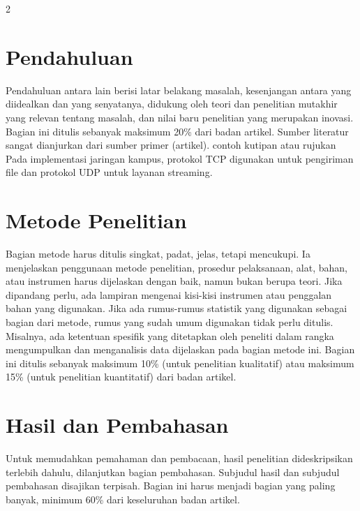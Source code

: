 \documentclass{jurnalft}
\begin{document}
	\begin{multicols}{2}
	\section{Pendahuluan}	
	Pendahuluan antara lain berisi latar belakang masalah, kesenjangan antara yang diidealkan dan yang senyatanya, didukung oleh teori dan penelitian mutakhir yang relevan tentang masalah, dan nilai baru penelitian yang merupakan inovasi. Bagian ini ditulis sebanyak maksimum 20\% dari badan artikel. Sumber literatur sangat dianjurkan dari sumber primer (artikel). contoh kutipan atau rujukan Pada implementasi jaringan kampus, protokol TCP digunakan untuk pengiriman file dan protokol UDP untuk layanan streaming.
	
	
	\section{Metode Penelitian}
	Bagian metode harus ditulis singkat, padat, jelas, tetapi mencukupi. Ia menjelaskan penggunaan metode penelitian, prosedur pelaksanaan, alat, bahan, atau instrumen harus dijelaskan dengan baik, namun bukan berupa teori. Jika dipandang perlu, ada lampiran mengenai kisi-kisi instrumen atau penggalan bahan yang digunakan. Jika ada rumus-rumus statistik yang digunakan sebagai bagian dari metode, rumus yang sudah umum digunakan tidak perlu ditulis. Misalnya, ada ketentuan spesifik yang ditetapkan oleh peneliti dalam rangka mengumpulkan dan menganalisis data dijelaskan pada bagian metode ini. Bagian ini ditulis sebanyak maksimum 10\% (untuk penelitian kualitatif) atau maksimum 15\% (untuk penelitian kuantitatif) dari badan artikel.
	
	\section{Hasil dan Pembahasan}
	Untuk memudahkan pemahaman dan pembacaan,  hasil penelitian dideskripsikan terlebih dahulu, dilanjutkan bagian pembahasan. Subjudul hasil dan subjudul pembahasan disajikan terpisah. Bagian ini harus menjadi bagian yang paling banyak, minimum 60\% dari keseluruhan badan artikel.
	

\end{multicols}
\end{document}
